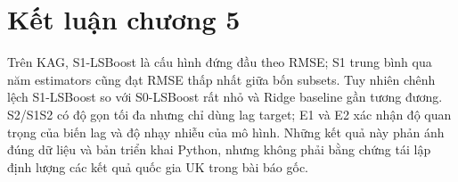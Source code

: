 \section{Kết luận chương 5}\label{kux1ebft-luux1eadn-chux1b0ux1a1ng-4}

Trên KAG, S1-LSBoost là cấu hình đứng đầu theo RMSE; S1 trung bình qua năm estimators cũng đạt RMSE thấp nhất giữa bốn subsets. Tuy nhiên chênh lệch S1-LSBoost so với S0-LSBoost rất nhỏ và Ridge baseline gần tương đương. S2/S1S2 có độ gọn tối đa nhưng chỉ dùng lag target; E1 và E2 xác nhận độ quan trọng của biến lag và độ nhạy nhiễu của mô hình. Những kết quả này phản ánh đúng dữ liệu và bản triển khai Python, nhưng không phải bằng chứng tái lập định lượng các kết quả quốc gia UK trong bài báo gốc.
